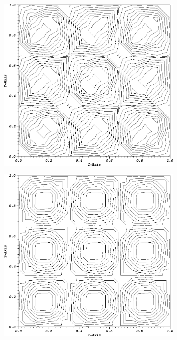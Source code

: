 \begin{figure}
{\begin{subfigure}[b]{0.45\textwidth}
	\end{subfigure}
}
\vspace{2.5mm}
{
	\begin{subfigure}[b]{0.45\textwidth}
		\centering
		\label{subfig::SineMMS_Tri00_PWL2}
		\includegraphics[width=\textwidth]{figures/sec_BF/MMSSine_PWLD2_Tri_cyc00.png}
	\end{subfigure}
	\hfill
	\begin{subfigure}[b]{0.45\textwidth}
		\centering
		\label{subfig::SineMMS_Tri01_PWL2}
		\includegraphics[width=\textwidth]{figures/sec_BF/MMSSine_PWLD2_Tri_cyc01.png}

\end{subfigure}}
\end{figure}
